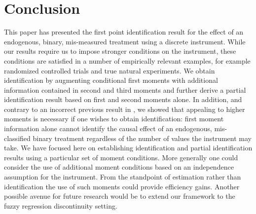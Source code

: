 \section{Conclusion}
This paper has presented the first point identification result for the effect of an endogenous, binary, mis-measured treatment using a discrete instrument.
While our results require us to impose stronger conditions on the instrument, these conditions are satisfied in a number of empirically relevant examples, for example randomized controlled trials and true natural experiments.
We obtain identification by augmenting conditional first moments with additional information contained in second and third moments and further derive a partial identification result based on first and second moments alone.
In addition, and contrary to an incorrect previous result in \cite{Mahajan}, we showed that appealing to higher moments is necessary if one wishes to obtain identification: first moment information alone cannot identify the causal effect of an endogenous, mis-classified binary treatment regardless of the number of values the instrument may take.
We have focused here on establishing identification and partial identification results using a particular set of moment conditions. More generally one could consider the use of additional moment conditions based on an independence assumption for the instrument.
From the standpoint of estimation rather than identification the use of such moments could provide efficiency gains.
Another possible avenue for future research would be to extend our framework to the fuzzy regression discontinuity setting.
